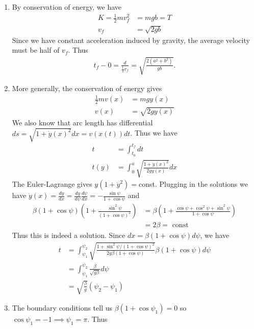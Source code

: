 \documentclass[12pt]{article}
\begin{document}
\begin{problem}[4]
\begin{enumerate}[label=(\roman*)]
	\item By conservation of energy, we have
		\begin{align*}
			K = \frac{1}{2} m v_f^2 &= mgb = T \\
			v_f &= \sqrt{2gb}  
		\end{align*}
	Since we have constant acceleration induced by gravity, the average velocity must be half of $ v_f$. Thus
	 \begin{align*}
		t_f-0 = \frac{d}{\frac{1}{2}v_f} = \sqrt{\frac{2(a^2+b^2)}{gb }}.
	\end{align*}
\item More generally, the conservation of energy gives
	\begin{align*}
		\frac{1}{2} m v(x) &= mgy(x) \\
		v(x) &= \sqrt{2g y(x)}  
	\end{align*}
	We also know that arc length has differential $ ds = \sqrt{1+\dot{y}(x)^2} dx = v(x(t)) dt$. Thus we have
	\begin{align*}
		t &= \int_{ t_0}^{ t_f} dt   \\
		t(y)  &= \int_{ 0}^{ a} \sqrt{\frac{1+\dot{y}(x)^2}{2gy(x)}} dx  
	\end{align*}
	The Euler-Lagrange gives $ y(1+\dot{y}^2) = $const. Plugging in the solutions we have $ \dot{y}(x) = \frac{d y}{d x} = \frac{d y}{d \psi} \frac{d \psi}{d x} = - \frac{\sin \psi}{ 1+\cos \psi} $ and
	\begin{align*}
		\beta(1+\cos \psi)\left( 1+ \frac{\sin^2 \psi}{ (1+ \cos \psi)^2} \right)  &= \beta \left( 1+ \frac{\cos \psi + \cos^2 \psi + \sin^2\psi}{ 1+ \cos \psi} \right)   \\
		&= 2 \beta = \text{ const} 
	\end{align*}
	Thus this is indeed a solution. Since $ dx = \beta(1+\cos \psi) d \psi$, we have
	\begin{align*}
		t &= \int_{ \psi_1}^{ \psi_2} \sqrt{\frac{1+ \sin^2 \psi / (1+\cos \psi)^2}{ 2g \beta (1+ \cos \psi)}} \beta(1+\cos \psi) d \psi   \\
		&= \int_{ \psi_1}^{ \psi_2} \frac{\beta}{ \sqrt{g \beta} }  d \psi \\
		&= \sqrt{ \frac{\beta}{ g}} (\psi_2 - \psi_1)  
	\end{align*}
\item The boundary conditions tell us  $ \beta(1+\cos \psi_1) = 0$ so $ \cos \psi_1 = -1 \implies \psi_1 = \pi$. Thus

\end{enumerate}
\end{problem}
\end{document}
